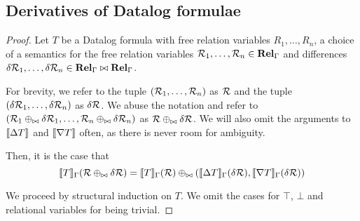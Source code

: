 \subsection {Derivatives of Datalog formulae}
\concreteDatalog*
\begin{proof}
  \label{prf:concreteDatalog}
  Let $T$ be a Datalog formula with free relation variables $R_1, \ldots, R_n$,
  a choice of a semantics for the free relation variables $\mathcal{R}_1, \ldots, \mathcal{R}_n \in \mathbf{Rel}_\Gamma$
  and differences $\delta \mathcal{R}_1, \ldots, \delta \mathcal{R}_n \in \mathbf{Rel}_\Gamma \bowtie \mathbf{Rel}_\Gamma$.

  For brevity, we refer to the tuple $(\mathcal{R}_1, \ldots, \mathcal{R}_n)$ as $\mathcal{R}$ and
  the tuple $(\delta \mathcal{R}_1, \ldots, \delta \mathcal{R}_n)$ as $\delta \mathcal{R}$. We abuse the notation
  and refer to $(\mathcal{R}_1 \oplus_{\bowtie} \delta \mathcal{R}_1, \ldots, \mathcal{R}_n \oplus_{\bowtie} \delta \mathcal{R}_n)$
  as $\mathcal{R} \oplus_{\bowtie} \delta \mathcal{R}$. We will also omit the arguments to $\llbracket \Delta{T} \rrbracket$ and
  $\llbracket \nabla{T} \rrbracket$ often, as there is never room for ambiguity.

  Then, it is the case that 
  \begin{displaymath}
    \llbracket T \rrbracket_\Gamma(\mathcal{R} \oplus_{\bowtie} \delta \mathcal{R})
    =
    \llbracket T \rrbracket_\Gamma(\mathcal{R}) \oplus_{\bowtie} 
    (\llbracket \Delta{T} \rrbracket_\Gamma(\delta \mathcal{R}), 
    \llbracket \nabla{T} \rrbracket_\Gamma(\delta \mathcal{R}))
  \end{displaymath}

  We proceed by structural induction on $T$. We omit the cases for $\top$, $\bot$
  and relational variables for being trivial.
  

\end{proof}
